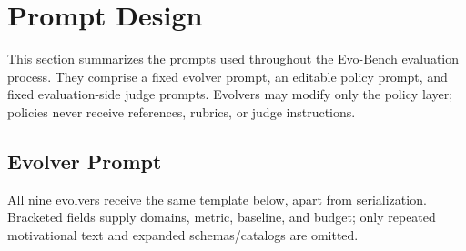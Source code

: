 \section{Prompt Design}
\label{app:prompt-design}

This section summarizes the prompts used throughout the Evo-Bench evaluation process.  They comprise a fixed evolver prompt, an editable policy prompt, and fixed evaluation-side judge prompts.  Evolvers may modify only the policy layer; policies never receive references, rubrics, or judge instructions.


\subsection{Evolver Prompt}
\label{app:evolver-prompt}

All nine evolvers receive the same template below, apart from serialization.
Bracketed fields supply domains, metric, baseline, and budget; only repeated
motivational text and expanded schemas/catalogs are omitted.

